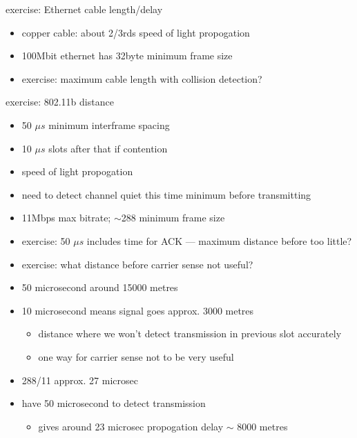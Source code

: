 \begin{frame}{exercise: Ethernet cable length/delay}
    \begin{itemize}
    \item copper cable: about 2/3rds speed of light propogation
    \item 100Mbit ethernet has 32byte minimum frame size
    \vspace{.5cm}
    \item exercise: maximum cable length with collision detection?
    \end{itemize}
\end{frame}

\begin{frame}{exercise: 802.11b distance}
    \begin{itemize}
    \item 50 $\mu s$ minimum interframe spacing
    \item 10 $\mu s$ slots after that if contention
    \item speed of light propogation
    \item need to detect channel quiet this time minimum before transmitting
    \item 11Mbps max bitrate; $\sim$288 minimum frame size
    \vspace{.5cm}
    \item exercise: 50 $\mu s$ includes time for ACK --- maximum distance before too little?
    \item exercise: what distance before carrier sense not useful?
    \end{itemize}
\end{frame}

\begin{frame}{}
\begin{itemize}
\item 50 microsecond around 15000 metres
\item 10 microsecond means signal goes approx. 3000 metres
    \begin{itemize}
    \item distance where we won't detect transmission in previous slot accurately
    \item one way for carrier sense not to be very useful
    \end{itemize}
\item 288/11 approx. 27 microsec 
\item have 50 microsecond to detect transmission
    \begin{itemize}
    \item gives around 23 microsec propogation delay $\sim$ 8000 metres
    \end{itemize}
\end{itemize}
\end{frame}
